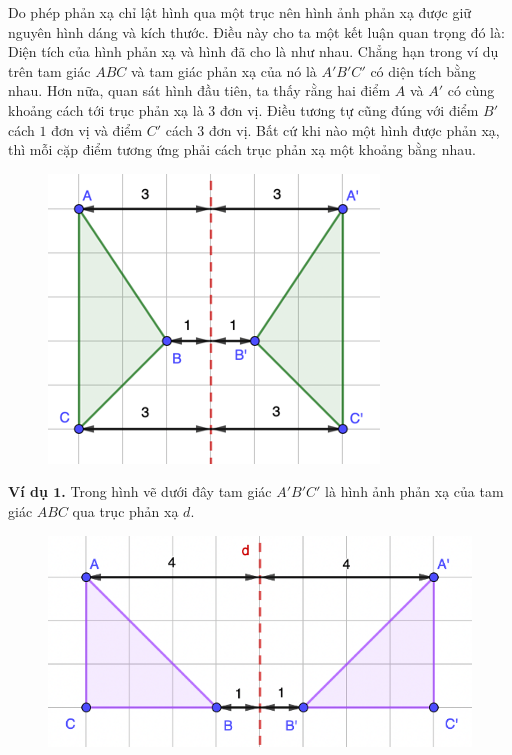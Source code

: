 \begin{multicols}{2}
\begin{figure}[H]
		\vspace*{-10pt}
	\end{figure}
	Do phép phản xạ chỉ lật hình qua một trục nên hình ảnh phản xạ được giữ nguyên hình dáng và kích thước. Điều này cho ta một kết luận quan trọng đó là: Diện tích của hình phản xạ và hình đã cho là như nhau. Chẳng hạn trong ví dụ trên tam giác $ABC$ và tam giác phản xạ của nó là $A'B'C'$ có diện tích bằng nhau. Hơn nữa, quan sát hình đầu tiên, ta thấy rằng hai điểm $A$ và $A'$ có cùng khoảng cách tới trục phản xạ là $3$ đơn vị. Điều tương tự cũng đúng với điểm $B'$ cách $1$ đơn vị và điểm $C'$ cách $3$ đơn vị. Bất cứ khi nào một hình được phản xạ, thì mỗi cặp điểm tương ứng phải cách trục phản xạ một khoảng bằng nhau. 
	\begin{figure}[H]
		\vspace*{-5pt}
		\centering
		\captionsetup{labelformat= empty, justification=centering}
		\includegraphics[width= 0.65\linewidth]{Picture4}
		\vspace*{-10pt}
	\end{figure}
	\textbf{\color{toancuabi}Ví dụ $\pmb1$.} Trong hình vẽ dưới đây tam giác $A'B'C'$ là hình ảnh phản xạ của tam giác $ABC$ qua trục phản xạ $d$.
	\begin{figure}[H]
		\vspace*{-5pt}
		\centering
		\captionsetup{labelformat= empty, justification=centering}
		\includegraphics[width= 1\linewidth]{Picture5}

\end{figure}
\end{multicols}

